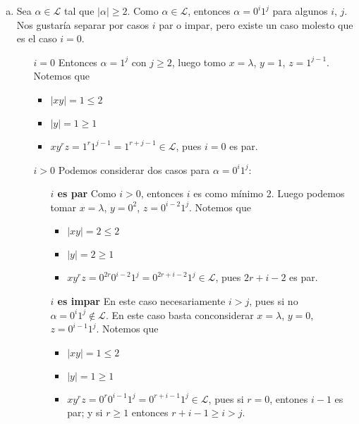 \documentclass[hidelinks,a4paper,11pt, nofootinbib]{article}
\newcommand{\ele}{\mathcal{L}}
\begin{document}
\begin{enumerate}[a.]
\item Sea $\alpha \in \ele$ tal que $|\alpha| \geq 2$.
Como $\alpha \in \ele$, entonces $\alpha = 0^i1^j$ para algunos $i$, $j$.
Nos gustaría separar por casos $i$ par o impar, pero existe un caso molesto que es el caso $i = 0$.

\begin{enumerate}
\item[\underline{$i = 0$}] Entonces $\alpha = 1^j$ con $j \geq 2$,
                           luego tomo $x = \lambda$, $y = 1$, $z = 1^{j-1}$.
    Notemos que
    \begin{itemize}
    \item $|x y| =1 \leq 2$
    \item $|y| = 1 \geq 1$
    \item $xy^rz = 1^r1^{j-1} = 1^{r+j-1} \in \ele$, pues $i = 0$ es par.
    \end{itemize}
\item[\underline{$i > 0$}] Podemos considerar dos casos para $\alpha = 0^i1^j$:
  \begin{itemize}
  \item[\textbf{$i$ es par}] Como $i > 0$, entonces $i$ es como mínimo 2. Luego podemos tomar
               $x = \lambda$, $y = 0^2$, $z = 0^{i-2}1^j$. Notemos que
        \begin{itemize}
        \item $|x y| = 2 \leq 2$
        \item $|y| = 2 \geq 1$
        \item $xy^rz = 0^{2r}0^{i-2}1^j = 0^{2r+i-2}1^j \in \ele$, pues $2r+i-2$ es par.
        \end{itemize}
  \item[\textbf{$i$ es impar}] En este caso necesariamente $i > j$,
               pues si no $\alpha = 0^i1^j \not\in \ele$.
               En este caso basta conconsiderar $x = \lambda$, $y = 0$, $z = 0^{i-1}1^j$.
               Notemos que
        \begin{itemize}
        \item $|x y| = 1 \leq 2$
        \item $|y| = 1 \geq 1$
        \item $xy^rz = 0^{r}0^{i-1}1^j = 0^{r+i-1}1^j \in \ele$,
             pues si $r = 0$, entones $i - 1$ es par; y si $r \geq 1$ entonces $r + i - 1 \geq i > j$.
        \end{itemize}
    \end{itemize}
\end{enumerate}


\end{enumerate}
\end{document}
